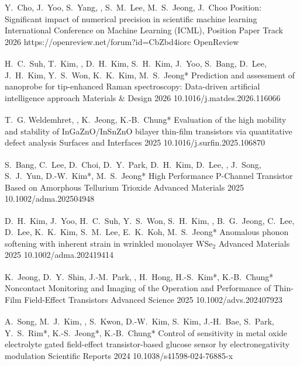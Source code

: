 \documentclass[11pt, a4paper]{awesome-cv}
\begin{document}
\begin{cvitems}
  \publink
    {Y.~Cho, J.~Yoo, S.~Yang, , S.~M.~Lee, M.~S.~Jeong, J.~Choo}
    {Position: Significant impact of numerical precision in scientific machine learning}
    {International Conference on Machine Learning (ICML), Position Paper Track}
    {2026}
    {https://openreview.net/forum?id=CbZbd4iorc}
    {OpenReview}

  \pub
    {H.~C.~Suh\textsuperscript{\dag}, T.~Kim\textsuperscript{\dag}, , D.~H.~Kim, S.~H.~Kim, J.~Yoo, S.~Bang, D.~Lee, J.~H.~Kim, Y.~S.~Won, K.~K.~Kim, M.~S.~Jeong*}
    {Prediction and assessment of nanoprobe for tip-enhanced Raman spectroscopy: Data-driven artificial intelligence approach}
    {Materials \& Design}
    {2026}
    {10.1016/j.matdes.2026.116066}

  \pub
    {T.~G. Weldemhret\textsuperscript{\dag}, \textsuperscript{\dag}, K.~Jeong, K.-B.~Chung*}
    {Evaluation of the high mobility and stability of InGaZnO/InSnZnO bilayer thin-film transistors via quantitative defect analysis}
    {Surfaces and Interfaces}
    {2025}
    {10.1016/j.surfin.2025.106870}

  \pub
    {S.~Bang\textsuperscript{\dag}, C.~Lee\textsuperscript{\dag}, D.~Choi, D.~Y.~Park, D.~H.~Kim, D.~Lee, , J.~Song, S.~J.~Yun, D.-W.~Kim*, M.~S.~Jeong*}
    {High Performance P-Channel Transistor Based on Amorphous Tellurium Trioxide}
    {Advanced Materials}
    {2025}
    {10.1002/adma.202504948}

  \pub
    {D.~H.~Kim\textsuperscript{\dag}, J.~Yoo, H.~C.~Suh, Y.~S.~Won, S.~H.~Kim, , B.~G.~Jeong, C.~Lee, D.~Lee, K.~K.~Kim, S.~M.~Lee, E.~K.~Koh, M.~S.~Jeong*}
    {Anomalous phonon softening with inherent strain in wrinkled monolayer WSe$_2$}
    {Advanced Materials}
    {2025}
    {10.1002/adma.202419414}

  \pub
    {K.~Jeong\textsuperscript{\dag}, D.~Y.~Shin, J.-M.~Park, , H.~Hong, H.-S.~Kim*, K.-B.~Chung*}
    {Noncontact Monitoring and Imaging of the Operation and Performance of Thin-Film Field-Effect Transistors}
    {Advanced Science}
    {2025}
    {10.1002/advs.202407923}

  \pub
    {A.~Song\textsuperscript{\dag}, M.~J.~Kim, , S.~Kwon, D.-W.~Kim, S.~Kim, J.-H.~Bae, S.~Park, Y.~S.~Rim*, K.-S.~Jeong*, K.-B.~Chung*}
    {Control of sensitivity in metal oxide electrolyte gated field-effect transistor-based glucose sensor by electronegativity modulation}
    {Scientific Reports}
    {2024}
    {10.1038/s41598-024-76885-x}


\end{cvitems}
\end{document}
